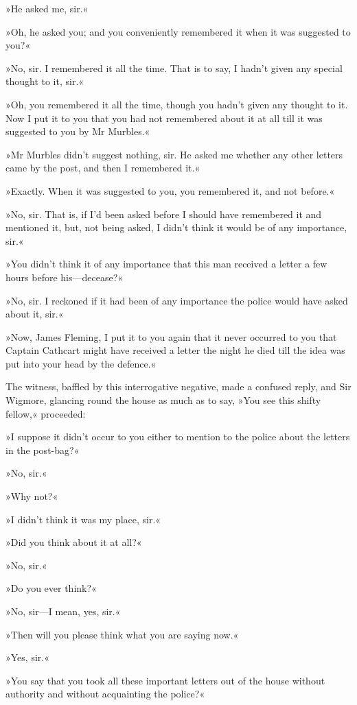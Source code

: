 »He asked me, sir.«

»Oh, he asked you; and you conveniently remembered it when it was suggested to you?«

»No, sir. I remembered it all the time. That is to say, I hadn't given any special thought to it, sir.«

»Oh, you remembered it all the time, though you hadn't given any thought to it. Now I put it to you that you had not remembered about it at all till it was suggested to you by Mr Murbles.«

»Mr Murbles didn't suggest nothing, sir. He asked me whether any other letters came by the post, and then I remembered it.«

»Exactly. When it was suggested to you, you remembered it, and not before.«

»No, sir. That is, if I'd been asked before I should have remembered it and mentioned it, but, not being asked, I didn't think it would be of any importance, sir.«

»You didn't think it of any importance that this man received a letter a few hours before his—decease?«

»No, sir. I reckoned if it had been of any importance the police would have asked about it, sir.«

»Now, James Fleming, I put it to you again that it never occurred to you that Captain Cathcart might have received a letter the night he died till the idea was put into your head by the defence.«

The witness, baffled by this interrogative negative, made a confused reply, and Sir Wigmore, glancing round the house as much as to say, »You see this shifty fellow,« proceeded:

»I suppose it didn't occur to you either to mention to the police about the letters in the post-bag?«

»No, sir.«

»Why not?«

»I didn't think it was my place, sir.«

»Did you think about it at all?«

»No, sir.«

»Do you ever think?«

»No, sir—I mean, yes, sir.«

»Then will you please think what you are saying now.«

»Yes, sir.«

»You say that you took all these important letters out of the house without authority and without acquainting the police?«

